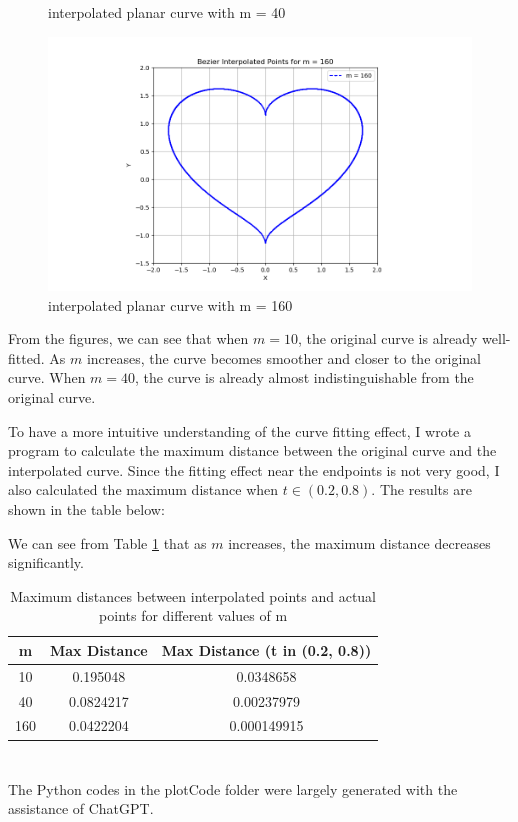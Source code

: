 \documentclass[a4paper]{article}
\begin{document}
\begin{figure}[ht]
\begin{minipage}[b]{0.45\textwidth}
    \caption{interpolated planar curve with m = 40}
    \label{fig:bezierm40}
  \end{minipage}
  \hfill
  \begin{minipage}[b]{0.45\textwidth}
    \centering
    \includegraphics[width=\textwidth]{figures/bezier_update3.png}
    \caption{interpolated planar curve with m = 160}
    \label{fig:bezierm160}
  \end{minipage}
\end{figure}



From the figures, we can see that when \( m = 10 \), the original curve is already well-fitted. As \( m \) increases, the curve becomes smoother and closer to the original curve. When \( m = 40 \), the curve is already almost indistinguishable from the original curve. 

To have a more intuitive understanding of the curve fitting effect, I wrote a program to calculate the maximum distance between the original curve and the interpolated curve. Since the fitting effect near the endpoints is not very good, I also calculated the maximum distance when \( t \in (0.2, 0.8) \). The results are shown in the table below:

We can see from Table \ref{tab:interpolation_distances} that as \( m \) increases, the maximum distance decreases significantly.
\begin{table}[H]
  \centering
  \begin{tabular}{|c|c|c|}
    \hline
    \textbf{m} & \textbf{Max Distance} & \textbf{Max Distance (t in (0.2, 0.8))} \\
    \hline
    10 & 0.195048 & 0.0348658 \\
    \hline
    40 & 0.0824217 & 0.00237979 \\
    \hline
    160 & 0.0422204 & 0.000149915 \\
    \hline
  \end{tabular}
  \caption{Maximum distances between interpolated points and actual points for different values of m}
  \label{tab:interpolation_distances}
\end{table}
\section*{  }
The Python codes in the plotCode folder were largely generated with the assistance of ChatGPT.
\end{document}

